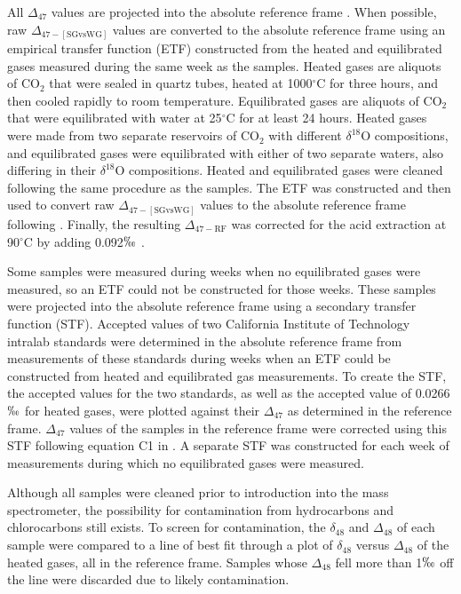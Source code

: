 \documentclass[5p, authoryear]{elsarticle}
\newcommand{\deltao}{$\delta^{18}$}
\newcommand{\degrees}{$^{\circ}$}
\begin{document}
All $\Delta_{47}$ values are projected into the absolute reference frame \citep{Dennis2011}. When possible, raw $\Delta_{47-[\text{SGvsWG}]}$ values are converted to the absolute reference frame using an empirical transfer function (ETF) constructed from the heated and equilibrated gases measured during the same week as the samples. Heated gases are aliquots of CO$_2$ that were sealed in quartz tubes, heated at 1000\degrees C for three hours, and then cooled rapidly to room temperature. Equilibrated gases are aliquots of CO$_2$ that were equilibrated with water at 25\degrees C for at least 24 hours. Heated gases were made from two separate reservoirs of CO$_2$ with different \deltao O compositions, and equilibrated gases were equilibrated with either of two separate waters, also differing in their \deltao O compositions. Heated and equilibrated gases were cleaned following the same procedure as the samples. The ETF was constructed and then used to convert raw $\Delta_{47-[\text{SGvsWG}]}$ values to the absolute reference frame following \cite{Dennis2011}. Finally, the resulting $\Delta_{47-\text{RF}}$ was corrected for the acid extraction at 90\degrees C by adding 0.092$\permil$ \citep{Henkes2013}. 

Some samples were measured during weeks when no equilibrated gases were measured, so an ETF could not be constructed for those weeks. These samples were projected into the absolute reference frame using a secondary transfer function (STF). Accepted values of two California Institute of Technology intralab standards were determined in the absolute reference frame from measurements of these standards during weeks when an ETF could be constructed from heated and equilibrated gas measurements. To create the STF, the accepted values for the two standards, as well as the accepted value of 0.0266$\permil$ for heated gases, were plotted against their $\Delta_{47}$ as determined in the \cite{Ghosh2006} reference frame. $\Delta_{47}$ values of the samples in the \cite{Ghosh2006} reference frame were corrected using this STF following equation C1 in \cite{Dennis2011}. A separate STF was constructed for each week of measurements during which no equilibrated gases were measured.

Although all samples were cleaned prior to introduction into the mass spectrometer, the possibility for contamination from hydrocarbons and chlorocarbons still exists. To screen for contamination, the $\delta_{48}$ and $\Delta_{48}$ of each sample were compared to a line of best fit through a plot of $\delta_{48}$ versus $\Delta_{48}$ of the heated gases, all in the \cite{Ghosh2006} reference frame. Samples whose $\Delta_{48}$ fell more than 1$\permil$ off the line were discarded due to likely contamination. 
\end{document}
